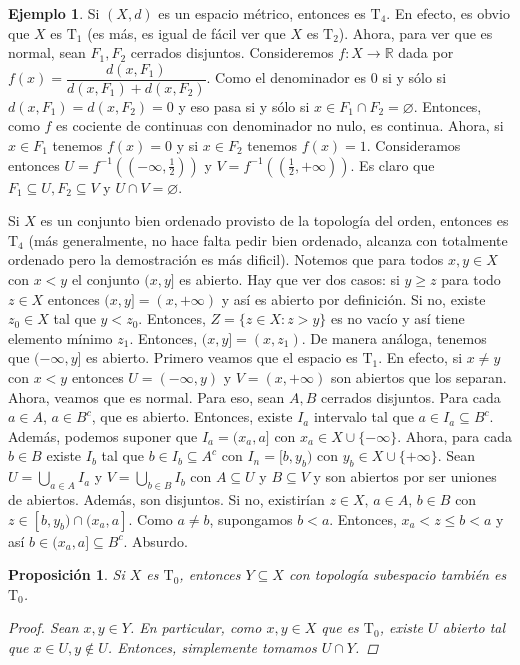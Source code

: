 \documentclass[12pt]{book}
\newtheorem{prop}[teo]{Proposición}
\theoremstyle{definition}
\newtheorem{ex}[teo]{Ejemplo}
\newcommand{\RR}{\mathbb{R}}      %
\let\emptyset\varnothing
\begin{document}
\begin{ex}
Si $(X,d)$ es un espacio métrico, entonces es $\mathrm{T}_4$. En efecto, es obvio que $X$ es $\mathrm{T}_1$ (es más, es igual de fácil ver que $X$ es $\mathrm{T}_2$). Ahora, para ver que es normal, sean $F_1,F_2$ cerrados disjuntos. Consideremos $f:X\to\RR$ dada por $f(x)=\dfrac{d(x,F_1)}{d(x,F_1)+d(x,F_2)}$. Como el denominador es $0$ si y sólo si $d(x,F_1)=d(x,F_2)=0$ y eso pasa si y sólo si $x\in F_1\cap F_2 = \emptyset$. Entonces, como $f$ es cociente de continuas con denominador no nulo, es continua. Ahora, si $x\in F_1$ tenemos $f(x)=0$ y si $x\in F_2$ tenemos $f(x)=1$. Consideramos entonces $U=f^{-1}((-\infty,\frac{1}{2}))$ y $V=f^{-1}((\frac{1}{2},+\infty))$. Es claro que $F_1\subseteq U, F_2\subseteq V$ y $U\cap V = \emptyset$.

Si $X$ es un conjunto bien ordenado provisto de la topología del orden, entonces es $\mathrm{T}_4$ (más generalmente, no hace falta pedir bien ordenado, alcanza con totalmente ordenado pero la demostración es más dificil). Notemos que para todos $x,y\in X$ con $x<y$ el conjunto $(x,y]$ es abierto. Hay que ver dos casos: si $y\geq z$ para todo $z\in X$ entonces $(x,y] = (x,+\infty)$ y así es abierto por definición. Si no, existe $z_0\in X$ tal que $y<z_0$. Entonces, $Z=\{z\in X : z>y\}$ es no vacío y así tiene elemento mínimo $z_1$. Entonces, $(x,y] = (x,z_1)$. De manera análoga, tenemos que $(-\infty,y]$ es abierto. Primero veamos que el espacio es $\mathrm{T}_1$. En efecto, si $x\neq y$ con $x<y$ entonces $U = (-\infty,y)$ y $V=(x,+\infty)$ son abiertos que los separan. Ahora, veamos que es normal. Para eso, sean $A,B$ cerrados disjuntos. Para cada $a\in A$, $a\in B^c$, que es abierto. Entonces, existe $I_a$ intervalo tal que $a\in I_a\subseteq B^c$. Además, podemos suponer que $I_a = (x_a,a]$ con $x_a\in X\cup\{-\infty\}$. Ahora, para cada $b\in B$ existe $I_b$ tal que $b\in I_b\subseteq A^c$ con $I_n = [b,y_b)$ con $y_b \in X\cup\{+\infty\}$. Sean $U=\displaystyle\bigcup_{a\in A} I_a$ y $V=\displaystyle\bigcup_{b\in B} I_b$ con $A\subseteq U$ y $B\subseteq V$ y son abiertos por ser uniones de abiertos. Además, son disjuntos. Si no, existirían $z\in X,\,a\in A,\,b\in B$ con $z\in [b,y_b) \cap (x_a,a]$. Como $a\neq b$, supongamos $b<a$. Entonces, $x_a < z\leq b < a$ y así $b\in (x_a, a]\subseteq B^c$. Absurdo.
\end{ex}

\begin{prop}
Si $X$ es $\mathrm{T}_0$, entonces $Y\subseteq X$ con topología subespacio también es $\mathrm{T}_0$.
\begin{proof}
Sean $x,y\in Y$. En particular, como $x,y\in X$ que es $\mathrm{T}_0$, existe $U$ abierto tal que $x\in U, y\notin U$. Entonces, simplemente tomamos $U\cap Y$.
\end{proof}
\end{prop}
\end{document}

